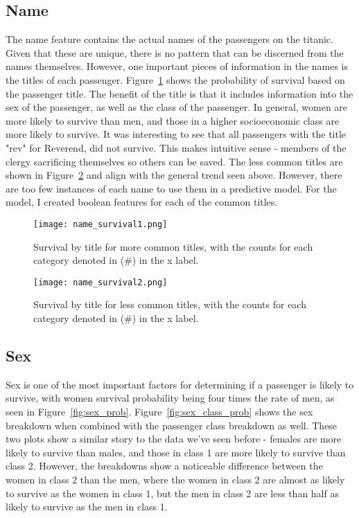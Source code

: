 \documentclass[12pt, letterpaper]{article}
\begin{document}
\subsection{Name}

The name feature contains the actual names of the passengers on the titanic. Given that these are unique, there is no pattern that can be discerned from the names themselves. However, one important pieces of information in the names is the titles of each passenger. Figure~\ref{fig:name_prob1} shows the probability of survival based on the passenger title. The benefit of the title is that it includes information into the sex of the passenger, as well as the class of the passenger. In general, women are more likely to survive than men, and those in a higher socioeconomic class are more likely to survive. It was interesting to see that all passengers with the title "rev" for Reverend, did not survive. This makes intuitive sense - members of the clergy sacrificing themselves so others can be saved. The less common titles are shown in Figure~\ref{fig:name_prob2} and align with the general trend seen above. However, there are too few instances of each name to use them in a predictive model. For the model, I created boolean features for each of the common titles.

\begin{figure}[H]
    \centering
    \texttt{[image: name\_survival1.png]}
    \caption{Survival by title for more common titles, with the counts for each category denoted in (\#) in the x label. }
    \label{fig:name_prob1}
\end{figure}

\begin{figure}[H]
    \centering
    \texttt{[image: name\_survival2.png]}
    \caption{Survival by title for less common titles, with the counts for each category denoted in (\#) in the x label. }
    \label{fig:name_prob2}
\end{figure}

\subsection{Sex} \label{sex}

Sex is one of the most important factors for determining if a passenger is likely to survive, with women survival probability being four times the rate of men, as seen in Figure~\ref{fig:sex_prob}. Figure~\ref{fig:sex_class_prob} shows the sex breakdown when combined with the passenger class breakdown as well. These two plots show a similar story to the data we've seen before - females are more likely to survive than males, and those in class 1 are more likely to survive than class 2. However, the breakdowns show a noticeable difference between the women in class 2 than the men, where the women in class 2 are almost as likely to survive as the women in class 1, but the men in class 2 are less than half as likely to survive as the men in class 1.
\end{document}
